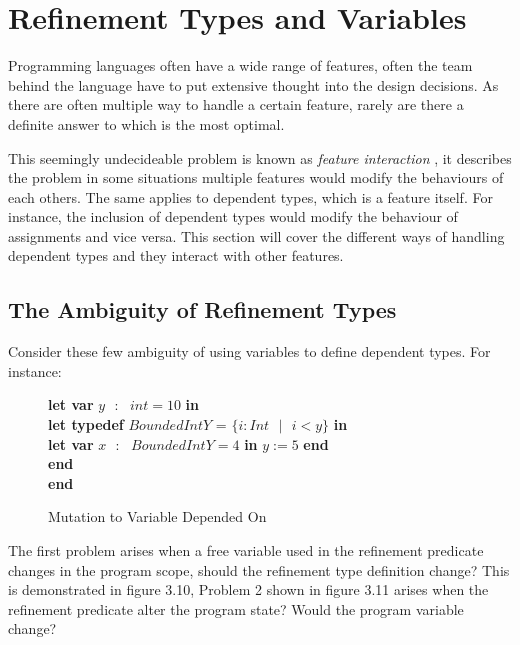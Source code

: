 \documentclass[a4paper,12pt]{report}
\newenvironment{tabs}[1]
 {\flushleft\TabPositions{#1}}
 {\endflushleft}
\begin{document}
\section{Refinement Types and Variables}
Programming languages often have a wide range of features, often the team behind 
the language have to put extensive thought into the design decisions. As there 
are often multiple way to handle a certain feature, rarely are there a definite 
answer to which is the most optimal.

\par
This seemingly undecideable problem is known as \textit{feature interaction} 
\cite{featInteract}, it describes the problem in some situations multiple 
features would modify the behaviours of each others. The same applies to 
dependent types, which is a feature itself. For instance, the inclusion of dependent types 
would modify the behaviour of assignments and vice versa. This section 
will cover the different ways of handling dependent types and they interact with 
other features.

\subsection{The Ambiguity of Refinement Types}
Consider these few ambiguity of using variables to define dependent types. For 
instance: 

\begin{figure} [H]
  \begin{tabs}{1cm,2cm}
    \textbf{let var }$y\text{ }:\text{ } int = 10$ \textbf{ in } \\
    \tab\textbf{let typedef }$BoundedIntY$ = $\{i : Int\text{ }|\text{ } i < y\}$ \textbf{ in } \\ 
    \tab\tab\textbf{let var }$x\text{ }:\text{ }BoundedIntY = 4$ \textbf{ in }$y := 5$\textbf { end} \\
    \tab\textbf {end} \\
    \textbf{end}
  \end{tabs}  
  \caption{Mutation to Variable Depended On}
\end{figure}

\par
The first problem arises when a free variable used in the refinement predicate 
changes in the program scope, should the refinement type definition change? 
This is demonstrated in figure 3.10, Problem 2 shown in figure 3.11 
arises when the refinement predicate alter the program state? Would the program 
variable change?
\end{document}
